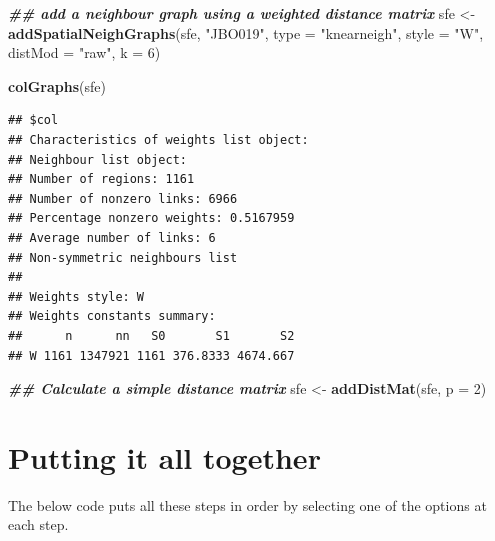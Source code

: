 \documentclass[
]{book}
\newenvironment{Shaded}{\begin{snugshade}}{\end{snugshade}}
\newcommand{\AttributeTok}[1]{\textcolor[rgb]{0.13,0.29,0.53}{#1}}
\newcommand{\DecValTok}[1]{\textcolor[rgb]{0.00,0.00,0.81}{#1}}
\newcommand{\DocumentationTok}[1]{\textcolor[rgb]{0.56,0.35,0.01}{\textbf{\textit{#1}}}}
\newcommand{\FunctionTok}[1]{\textcolor[rgb]{0.13,0.29,0.53}{\textbf{#1}}}
\newcommand{\NormalTok}[1]{#1}
\newcommand{\OtherTok}[1]{\textcolor[rgb]{0.56,0.35,0.01}{#1}}
\newcommand{\StringTok}[1]{\textcolor[rgb]{0.31,0.60,0.02}{#1}}
\begin{document}
\begin{Shaded}
\begin{Highlighting}[]
\DocumentationTok{\#\# add a neighbour graph using a weighted distance matrix}
\NormalTok{sfe }\OtherTok{\textless{}{-}} \FunctionTok{addSpatialNeighGraphs}\NormalTok{(sfe, }\StringTok{"JBO019"}\NormalTok{, }\AttributeTok{type =} \StringTok{"knearneigh"}\NormalTok{, }\AttributeTok{style =} \StringTok{"W"}\NormalTok{, }\AttributeTok{distMod =} \StringTok{"raw"}\NormalTok{, }\AttributeTok{k =} \DecValTok{6}\NormalTok{)}

\FunctionTok{colGraphs}\NormalTok{(sfe)}
\end{Highlighting}
\end{Shaded}

\begin{verbatim}
## $col
## Characteristics of weights list object:
## Neighbour list object:
## Number of regions: 1161 
## Number of nonzero links: 6966 
## Percentage nonzero weights: 0.5167959 
## Average number of links: 6 
## Non-symmetric neighbours list
## 
## Weights style: W 
## Weights constants summary:
##      n      nn   S0       S1       S2
## W 1161 1347921 1161 376.8333 4674.667
\end{verbatim}

\begin{Shaded}
\begin{Highlighting}[]
\DocumentationTok{\#\# Calculate a simple distance matrix}
\NormalTok{sfe }\OtherTok{\textless{}{-}} \FunctionTok{addDistMat}\NormalTok{(sfe, }\AttributeTok{p =} \DecValTok{2}\NormalTok{)}
\end{Highlighting}
\end{Shaded}

\hypertarget{putting-it-all-together-1}{%
\section{Putting it all together}\label{putting-it-all-together-1}}

The below code puts all these steps in order by selecting one of the options at each step.
\end{document}
